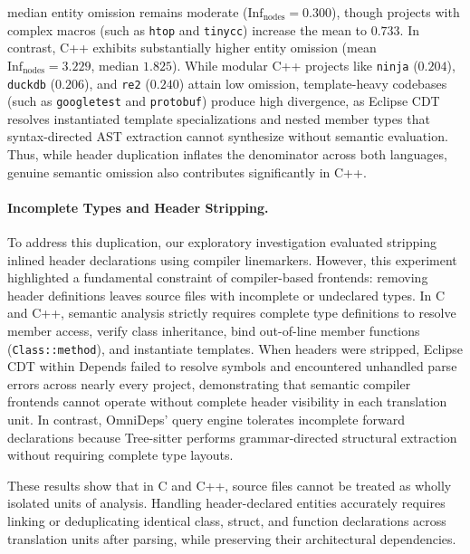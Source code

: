 median entity omission remains moderate ($\text{Inf}_{\text{nodes}} = 0.300$),
though projects with complex macros (such as \texttt{htop} and \texttt{tinycc})
increase the mean to $0.733$. In contrast, C++ exhibits substantially higher
entity omission (mean $\text{Inf}_{\text{nodes}} = 3.229$, median $1.825$).
While modular C++ projects like \texttt{ninja} ($0.204$), \texttt{duckdb}
($0.206$), and \texttt{re2} ($0.240$) attain low omission, template-heavy
codebases (such as \texttt{googletest} and \texttt{protobuf}) produce high
divergence, as Eclipse CDT resolves instantiated template specializations and
nested member types that syntax-directed AST extraction cannot synthesize
without semantic evaluation. Thus, while header duplication inflates the
denominator across both languages, genuine semantic omission also contributes
significantly in C++.

\paragraph{Incomplete Types and Header Stripping.}
To address this duplication, our exploratory investigation evaluated stripping
inlined header declarations using compiler linemarkers. However, this
experiment highlighted a fundamental constraint of compiler-based frontends:
removing header definitions leaves source files with incomplete or undeclared
types. In C and C++, semantic analysis strictly requires complete type
definitions to resolve member access, verify class inheritance, bind out-of-line
member functions (\texttt{Class::method}), and instantiate templates. When
headers were stripped, Eclipse CDT within Depends failed to resolve symbols and
encountered unhandled parse errors across nearly every project, demonstrating
that semantic compiler frontends cannot operate without complete header
visibility in each translation unit. In contrast, OmniDeps' query engine
tolerates incomplete forward declarations because Tree-sitter performs
grammar-directed structural extraction without requiring complete type layouts.

These results show that in C and C++, source files cannot be treated as
wholly isolated units of analysis. Handling header-declared entities accurately
requires linking or deduplicating identical class, struct, and function
declarations across translation units after parsing, while preserving their
architectural dependencies.

